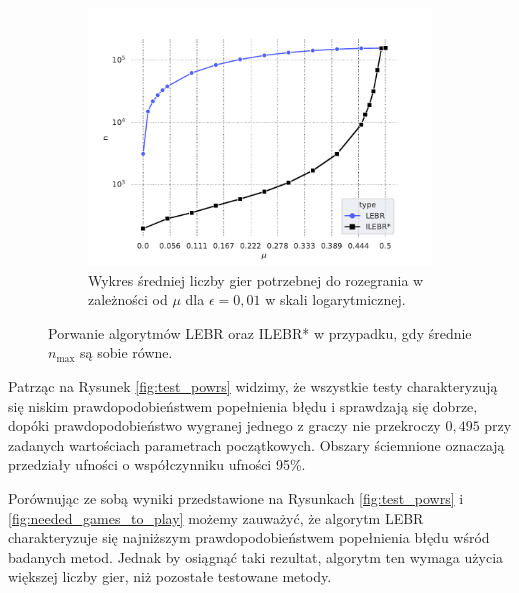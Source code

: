 \documentclass[inzynierska]{pwr_wmat_praca_dyplomowa}
\theoremstyle{plain}
\numberwithin{theorem}{chapter}
\theoremstyle{definition}
\numberwithin{theorem}{chapter}
\newcommand{\nmax}{n_{\text{max}}}
\begin{document}
\begin{figure}
\begin{subfigure}{.5\textwidth}
		\end{subfigure}%
		\begin{subfigure}[r]{.5\textwidth}
			\centering
			\includegraphics[width=1\linewidth]{imagens/needed_games_to_play_same_n_max_log.pdf}
			\caption{Wykres średniej liczby gier potrzebnej do rozegrania w zależności od $\mu$ dla $\epsilon=0,01$ w skali logarytmicznej.}
			\label{fig:game_to_play_same_n_max}
		\end{subfigure}
		\caption{Porwanie algorytmów LEBR oraz ILEBR* w przypadku, gdy średnie $\nmax$ są sobie równe.}
		\label{fig:same_n_max}
	\end{figure}
	Patrząc na Rysunek \ref{fig:test_powrs} widzimy, że wszystkie testy charakteryzują się niskim prawdopodobieństwem popełnienia błędu i sprawdzają się dobrze, dopóki prawdopodobieństwo wygranej jednego z graczy nie przekroczy $0,495$ przy zadanych wartościach parametrach początkowych. Obszary ściemnione oznaczają przedziały ufności o współczynniku ufności 95\%.
	
%	
	Porównując ze sobą wyniki przedstawione na Rysunkach \ref{fig:test_powrs} i \ref{fig:needed_games_to_play} możemy zauważyć, że algorytm LEBR charakteryzuje się najniższym prawdopodobieństwem popełnienia błędu wśród badanych metod.
	Jednak by osiągnąć taki rezultat, algorytm ten wymaga użycia większej liczby gier, niż pozostałe testowane metody.
	
\end{document}
